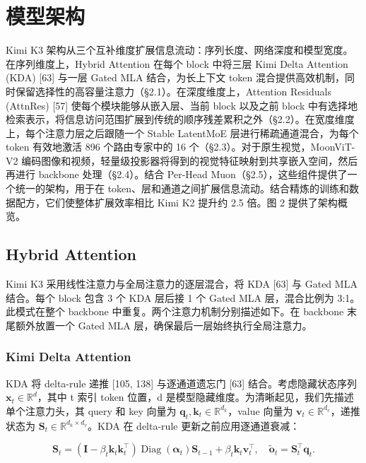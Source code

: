 
\section{模型架构}\label{model-architecture}

Kimi K3 架构从三个互补维度扩展信息流动：序列长度、网络深度和模型宽度。在序列维度上，Hybrid Attention 在每个 block 中将三层 Kimi Delta Attention (KDA) {[}63{]} 与一层 Gated MLA 结合，为长上下文 token 混合提供高效机制，同时保留选择性的高容量注意力（§2.1）。在深度维度上，Attention Residuals (AttnRes) {[}57{]} 使每个模块能够从嵌入层、当前 block 以及之前 block 中有选择地检索表示，将信息访问范围扩展到传统的顺序残差累积之外（§2.2）。在宽度维度上，每个注意力层之后跟随一个 Stable LatentMoE 层进行稀疏通道混合，为每个 token 有效地激活 896 个路由专家中的 16 个（§2.3）。对于原生视觉，MoonViT-V2 编码图像和视频，轻量级投影器将得到的视觉特征映射到共享嵌入空间，然后再进行 backbone 处理（§2.4）。结合 Per-Head Muon（§2.5），这些组件提供了一个统一的架构，用于在 token、层和通道之间扩展信息流动。结合精炼的训练和数据配方，它们使整体扩展效率相比 Kimi K2 提升约 2.5 倍。图 2 提供了架构概览。

\subsection{Hybrid Attention}\label{hybrid-attention}

Kimi K3 采用线性注意力与全局注意力的逐层混合，将 KDA {[}63{]} 与 Gated MLA 结合。每个 block 包含 3 个 KDA 层后接 1 个 Gated MLA 层，混合比例为 3:1。此模式在整个 backbone 中重复。两个注意力机制分别描述如下。在 backbone 末尾额外放置一个 Gated MLA 层，确保最后一层始终执行全局注意力。

\subsubsection{Kimi Delta Attention}\label{kimi-delta-attention}

KDA 将 delta-rule 递推 {[}105, 138{]} 与逐通道遗忘门 {[}63{]} 结合。考虑隐藏状态序列 \(\pmb { x } _ { t } \in \mathbb { R } ^ { d }\)，其中 t 索引 token 位置，d 是模型隐藏维度。为清晰起见，我们先描述单个注意力头，其 query 和 key 向量为 \(\boldsymbol { q } _ { t } , \boldsymbol { k } _ { t } \in \mathbb { R } ^ { d _ { k } }\)，value 向量为 \(\pmb { v } _ { t } \in \mathbb { R } ^ { d _ { v } }\)，递推状态为 \(\mathbf { S } _ { t } \in \mathbb { R } ^ { d _ { k } \times d _ { v } }\)。KDA 在 delta-rule 更新之前应用逐通道衰减：

\[
\mathbf {S} _ {t} = \left(\mathbf {I} - \beta_ {t} \boldsymbol {k} _ {t} \boldsymbol {k} _ {t} ^ {\top}\right) \operatorname{Diag} (\boldsymbol {\alpha} _ {t}) \mathbf {S} _ {t - 1} + \beta_ {t} \boldsymbol {k} _ {t} \boldsymbol {v} _ {t} ^ {\top}, \quad \tilde {\boldsymbol {o}} _ {t} = \mathbf {S} _ {t} ^ {\top} \boldsymbol {q} _ {t}.\tag{1}
\]

